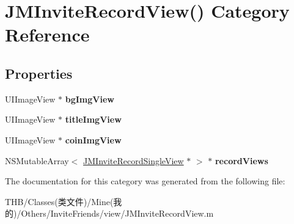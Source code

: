 \hypertarget{category_j_m_invite_record_view_07_08}{}\section{J\+M\+Invite\+Record\+View() Category Reference}
\label{category_j_m_invite_record_view_07_08}
\subsection*{Properties}
\begin{DoxyCompactItemize}
\item 
\mbox{\label{category_j_m_invite_record_view_07_08_adc3307d6d84552dd84d55cce70d2a394}} 
U\+I\+Image\+View $\ast$ {\bfseries bg\+Img\+View}
\item 
\mbox{\label{category_j_m_invite_record_view_07_08_a7ec23e5fffc8963dd6470f0e18245c69}} 
U\+I\+Image\+View $\ast$ {\bfseries title\+Img\+View}
\item 
\mbox{\label{category_j_m_invite_record_view_07_08_a11177d9a2a72e8c2e2f49df405c1cbcc}} 
U\+I\+Image\+View $\ast$ {\bfseries coin\+Img\+View}
\item 
\mbox{\label{category_j_m_invite_record_view_07_08_a7adbd4b24e7ed5380c885c9a779fdc28}} 
N\+S\+Mutable\+Array$<$ \mbox{\hyperlink{interface_j_m_invite_record_single_view}{J\+M\+Invite\+Record\+Single\+View}} $\ast$ $>$ $\ast$ {\bfseries record\+Views}
\end{DoxyCompactItemize}


The documentation for this category was generated from the following file\+:\begin{DoxyCompactItemize}
\item 
T\+H\+B/\+Classes(类文件)/\+Mine(我的)/\+Others/\+Invite\+Friends/view/J\+M\+Invite\+Record\+View.\+m\end{DoxyCompactItemize}
